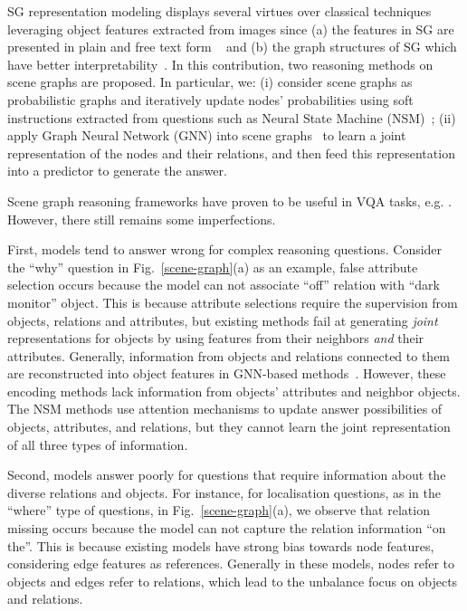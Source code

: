 \documentclass[letterpaper]{article} %
\begin{document}
SG representation modeling displays several virtues over classical techniques leveraging object features extracted from images since (a) the features in SG are presented in plain and free text form ~\cite{DBLP:journals/corr/abs-2101-05479} and (b) the graph structures of SG which have better interpretability~\cite{DBLP:conf/bmvc/ZhangCX19}.
In this contribution, two reasoning methods on scene graphs are proposed. In particular, we: (i) consider scene graphs as probabilistic graphs and iteratively update nodes' probabilities using soft instructions extracted from questions such as Neural State Machine (NSM)~\cite{DBLP:conf/nips/HudsonM19,DBLP:conf/ijcnn/LeLV020}; (ii) apply Graph Neural Network (GNN) into scene graphs~\cite{inproceedings,DBLP:conf/iccv/LiGCL19} to learn a joint representation of the nodes and their relations, and then feed this representation into a predictor to generate the answer. 

Scene graph reasoning frameworks have proven to be useful in VQA tasks, e.g. \cite{johnson2015image,yang2020prior}. 
However, there still remains some imperfections. 

First, models tend to answer wrong for complex reasoning questions. 
Consider the ``why'' question in Fig.~\ref{scene-graph}(a) as an example, false attribute selection occurs because the model can not associate ``off'' relation with ``dark monitor'' object.
This is because attribute selections require the supervision from objects, relations and attributes, but existing methods fail at generating \emph{joint} representations for objects by using features from their neighbors \emph{and} their attributes. 
Generally, information from objects and relations connected to them are reconstructed into object features in GNN-based methods~\cite{xu2019spatial}. However, these encoding methods lack information from objects' attributes and neighbor objects. 
The NSM methods use attention mechanisms to update answer possibilities of objects, attributes, and relations, but they cannot learn the joint representation of all three types of information. 

Second, models answer poorly for questions that require information about the diverse relations and objects. For instance, for localisation questions, as in the ``where'' type of questions, in Fig.~\ref{scene-graph}(a), we observe that relation missing occurs because the model can not capture the relation information ``on the''. This is because existing models have strong bias towards node features, considering edge features as references. Generally in these models, nodes refer to objects and edges refer to relations, which lead to the unbalance focus on objects and relations. 
\end{document}
